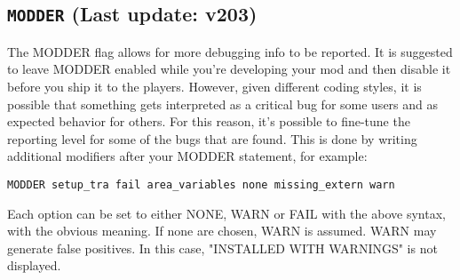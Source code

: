 \documentclass{article}
\def\DEFINE#1{{\tt \bf #1}\label{#1}\index{#1}}
\begin{document}
\subsection{\DEFINE{MODDER} (Last update: v203)}

The MODDER flag allows for more debugging info to be reported. It is suggested to
leave MODDER enabled while you're developing your mod and then disable it before
you ship it to the players. However, given different coding styles, it is possible
that something gets interpreted as a critical bug for some users and as expected
behavior for others. For this reason, it's possible to fine-tune the reporting level
for some of the bugs that are found. This is done by writing additional modifiers
after your MODDER statement, for example:
\begin{verbatim}
MODDER setup_tra fail area_variables none missing_extern warn
\end{verbatim}

Each option can be set to either NONE, WARN or FAIL with the above syntax,
with the obvious meaning. If none are chosen, WARN is assumed. WARN may generate false positives.
In this case, "INSTALLED WITH WARNINGS" is not displayed.
\end{document}
